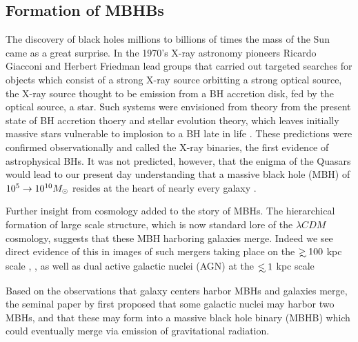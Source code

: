 \subsection{Formation of MBHBs}     The discovery of black holes millions to
billions of times the mass of the Sun came as a great surprise. In the 1970's
X-ray astronomy pioneers Ricardo Giacconi and Herbert Friedman lead groups
that carried out targeted searches for objects which consist of a strong X-ray
source orbitting a strong optical source, the X-ray source thought to be
emission from a BH accretion disk, fed by the optical source, a star. Such
systems were envisioned from theory from the present state of BH accretion
thoery and stellar evolution theory, which leaves initially massive stars
vulnerable to implosion to a BH late in life 
\citep[an entertaining historical account is found in][]{ThorneBHsTimeWarps:CH8}. 
These predictions were confirmed
observationally and called the X-ray binaries, the first evidence of
astrophysical BHs. It was not predicted, however, that the enigma of the
Quasars \citep[\emph{e.g.}][]{Schmidt:1963, Salpeter:1964, LyndenBell:1969}
would lead to our present day understanding that a massive black hole (MBH) of
$10^5 \rightarrow 10^{10} {M_{\odot}}$ resides at the heart of nearly every galaxy
\citep{kr95, KorHo:2013, ff05}.

Further insight from cosmology added to the story of MBHs. The hierarchical
formation of large scale structure, which is now standard lore of the $\lambda
CDM$ cosmology, suggests that these MBH harboring galaxies merge.
Indeed we see direct evidence of this in images of such mergers taking place
on the $\gsim 100$ kpc scale \citep{Comerford:2013}, \citep[see also][and
references therein]{Dotti:2012:rev}, as well as dual active galactic nuclei
(AGN) at the $\lsim 1$ kpc scale \citep{Komossa:2003, Fabbiano+2011,Rodriguez:2006, BurkeSpolaor:2011, ColpiDotti:2009, Gitti:2013, Woo:2014,
AndradeSantos:2016}



Based on the observations that galaxy centers harbor MBHs and galaxies merge,
the seminal paper by \cite{Begel:Blan:Rees:1980} first proposed that some
galactic nuclei may harbor two MBHs, and that these may form into a massive
black hole binary (MBHB) which could eventually merge via emission of
gravitational radiation.

